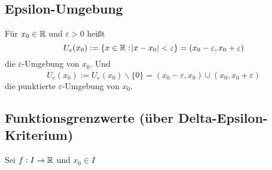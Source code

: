 \subsection{Epsilon-Umgebung}
Für $x_0 \in \mathbb{R}$ und $\varepsilon > 0$ heißt
\begin{equation*}
    U_e(x_0) := \{ x \in \mathbb{R}: \abs{x - x_0}<\varepsilon \} =
    (x_0 - \varepsilon, x_0+\varepsilon)
\end{equation*}
die $\varepsilon$-Umgebung von $x_0$. Und
\begin{equation*}
    \dot{U}_e(x_0) := U_e(x_0)\backslash \{0\} =
    (x_0-\varepsilon, x_0) \cup (x_0, x_0+\varepsilon)
\end{equation*}
die punktierte $\varepsilon$-Umgebung von $x_0$.

\subsection{Funktionsgrenzwerte (über Delta-Epsilon-Kriterium)}
Sei $f: I \rightarrow \mathbb{R}$ und $x_0 \in I$
